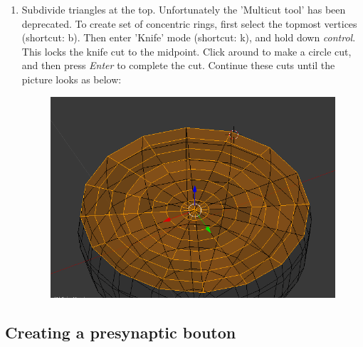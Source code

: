 \documentclass[twoside,a4paper]{refart}
\begin{document}
\begin{enumerate}
\item   Subdivide triangles at the top. Unfortunately the 'Multicut tool' has been deprecated. To create set of concentric rings, first select the topmost vertices (shortcut: b). Then enter 'Knife' mode (shortcut: k), and hold down \textit{control}. This locks the knife cut to the midpoint. Click around to make a circle cut, and then press \textit{Enter} to complete the cut. Continue these cuts until the picture looks as below:
        \begin{figure}[H]
        \includegraphics[scale=0.5]{spinehead6.png}
        \end{figure}
         
\end{enumerate}

\subsection{Creating a presynaptic bouton}
\end{document}
